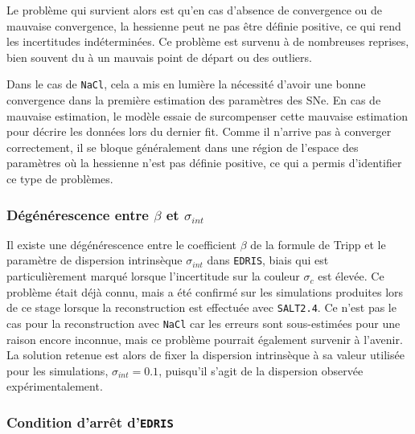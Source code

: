 \documentclass{book}
\def\nacl{\texttt{NaCl}\xspace}
\def\edris{\texttt{EDRIS}\xspace}
\def\saltd{\texttt{SALT2.4}\xspace}
\begin{document}
Le problème qui survient alors est qu'en cas d'absence de convergence ou de mauvaise convergence, la hessienne peut ne pas être définie positive, ce qui rend les incertitudes indéterminées. Ce problème est survenu à de nombreuses reprises, bien souvent du à un mauvais point de départ ou des outliers.

Dans le cas de \nacl, cela a mis en lumière la nécessité d'avoir une bonne convergence dans la première estimation des paramètres des SNe. En cas de mauvaise estimation, le modèle essaie de surcompenser cette mauvaise estimation pour décrire les données lors du dernier fit. Comme il n'arrive pas à converger correctement, il se bloque généralement dans une région de l'espace des paramètres où la hessienne n'est pas définie positive, ce qui a permis d'identifier ce type de problèmes.

\subsubsection{Dégénérescence entre $\beta$ et $\sigma_{int}$} 

Il existe une dégénérescence entre le coefficient $\beta$ de la formule de Tripp et le paramètre de dispersion intrinsèque $\sigma_{int}$ dans \edris, biais qui est particulièrement marqué lorsque l'incertitude sur la couleur $\sigma_c$ est élevée. Ce problème était déjà connu, mais a été confirmé sur les simulations produites lors de ce stage lorsque la reconstruction est effectuée avec \saltd. Ce n'est pas le cas pour la reconstruction avec \nacl car les erreurs sont sous-estimées pour une raison encore inconnue, mais ce problème pourrait également survenir à l'avenir. La solution retenue est alors de fixer la dispersion intrinsèque à sa valeur utilisée pour les simulations, $\sigma_{int} = 0.1$, puisqu'il s'agit de la dispersion observée expérimentalement.

\subsubsection{Condition d'arrêt d'\edris}
\end{document}
